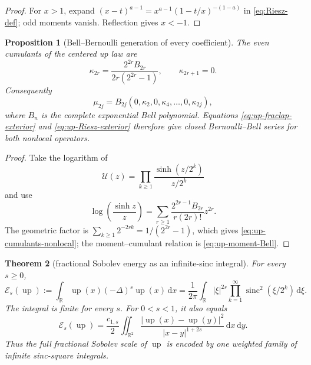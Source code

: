 \documentclass[11pt,oneside]{article}
\newtheorem{theorem}{Theorem}[section]
\newtheorem{proposition}[theorem]{Proposition}
\theoremstyle{definition}
\newcommand{\upf}{\operatorname{up}}
\newcommand{\R}{\mathbb R}
\newcommand{\dd}{\,\mathrm d}
\DeclareMathOperator{\sinc}{sinc}
\begin{document}
\begin{proof}
For \(x>1\), expand
\(
 (x-t)^{a-1}=x^{a-1}(1-t/x)^{-(1-a)}
\)
in \eqref{eq:Riesz-def}; odd moments vanish.  Reflection gives \(x<-1\).
\end{proof}

\begin{proposition}[Bell--Bernoulli generation of every coefficient]
\label{prop:up-cumulants-nonlocal}
The even cumulants of the centered up law are
\begin{equation}\label{eq:up-cumulants-nonlocal}
 \kappa_{2r}
 =\frac{2^{2r}B_{2r}}{2r(2^{2r}-1)},
 \qquad \kappa_{2r+1}=0.
\end{equation}
Consequently
\begin{equation}\label{eq:up-moment-Bell}
 \mu_{2j}=B_{2j}(0,\kappa_2,0,\kappa_4,\ldots,0,\kappa_{2j}),
\end{equation}
where \(B_n\) is the complete exponential Bell polynomial.  Equations
\eqref{eq:up-fraclap-exterior} and \eqref{eq:up-Riesz-exterior} therefore give
closed Bernoulli--Bell series for both nonlocal operators.
\end{proposition}

\begin{proof}
Take the logarithm of
\begin{equation*}
 \mathcal U(z)=\prod_{k\ge1}\frac{\sinh(z/2^k)}{z/2^k}
\end{equation*}
and use
\begin{equation*}
 \log\!\left(\frac{\sinh z}{z}\right)
 =\sum_{r\ge1}\frac{2^{2r-1}B_{2r}}{r(2r)!}z^{2r}.
\end{equation*}
The geometric factor is
\(\sum_{k\ge1}2^{-2rk}=1/(2^{2r}-1)\), which gives
\eqref{eq:up-cumulants-nonlocal}; the moment--cumulant relation is
\eqref{eq:up-moment-Bell}.
\end{proof}

\begin{theorem}[fractional Sobolev energy as an infinite-sinc integral]
\label{thm:up-fractional-energy}
For every \(s\ge0\),
\begin{equation}\label{eq:up-fractional-energy}
 \mathcal E_s(\upf)
 :=\int_{\R}\upf(x)(-\Delta)^s\upf(x)\dd x
 =\frac1{2\pi}\int_{\R}|\xi|^{2s}
  \prod_{k=1}^{\infty}\sinc^2(\xi/2^k)\dd\xi.
\end{equation}
The integral is finite for every \(s\).  For \(0<s<1\), it also equals
\begin{equation}\label{eq:up-Gagliardo-energy}
 \mathcal E_s(\upf)
 =\frac{c_{1,s}}2\iint_{\R^2}
  \frac{|\upf(x)-\upf(y)|^2}{|x-y|^{1+2s}}\dd x\dd y.
\end{equation}
Thus the full fractional Sobolev scale of \(\upf\) is encoded by one weighted family
of infinite sinc-square integrals.
\end{theorem}
\end{document}
